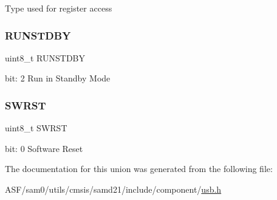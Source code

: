 Type used for register access \mbox{\label{union_u_s_b___c_t_r_l_a___type_aa24338c5cacc63e3b77adf2dc0938ff6}} 
\subsubsection{\texorpdfstring{RUNSTDBY}{RUNSTDBY}}
{\footnotesize\ttfamily uint8\+\_\+t R\+U\+N\+S\+T\+D\+BY}

bit\+: 2 Run in Standby Mode \mbox{\label{union_u_s_b___c_t_r_l_a___type_a9334d5ac0548802c90a8129c52c8e490}} 
\subsubsection{\texorpdfstring{SWRST}{SWRST}}
{\footnotesize\ttfamily uint8\+\_\+t S\+W\+R\+ST}

bit\+: 0 Software Reset 

The documentation for this union was generated from the following file\+:\begin{DoxyCompactItemize}
\item 
A\+S\+F/sam0/utils/cmsis/samd21/include/component/\mbox{\hyperlink{component_2usb_8h}{usb.\+h}}\end{DoxyCompactItemize}
